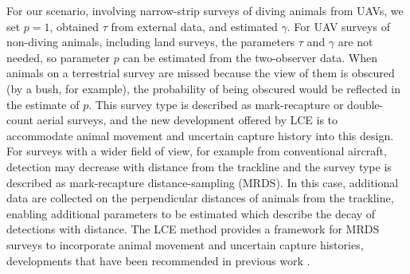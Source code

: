 \documentclass[useAMS, usenatbib, referee]{biom}\usepackage[]{graphicx}\usepackage[]{color}
\begin{document}
For our scenario, involving narrow-strip surveys of diving animals from UAVs, we set $p=1$, obtained $\tau$ from external data, and estimated $\gamma$. For UAV surveys of non-diving animals, including land surveys, the parameters $\tau$ and $\gamma$ are not needed, so parameter $p$ can be estimated from the two-observer data. When animals on a terrestrial survey are missed because the view of them is obscured (by a bush, for example), the probability of being obscured would be reflected in the estimate of $p$. This survey type is described as mark-recapture or double-count aerial surveys, and the new development offered by LCE is to accommodate animal movement and uncertain capture history into this design. For surveys with a wider field of view, for example from conventional aircraft, detection may decrease with distance from the trackline and the survey type is described as mark-recapture distance-sampling (MRDS). In this case, additional data are collected on the perpendicular distances of animals from the trackline, enabling additional parameters to be estimated which describe the decay of detections with distance. The LCE method provides a framework for MRDS surveys to incorporate animal movement and uncertain capture histories, developments that have been recommended in previous work \citep{Burt+al:14}.


\end{document}
